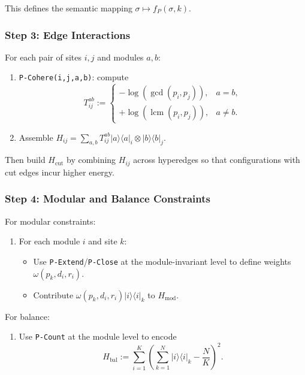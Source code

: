 \documentclass[11pt]{article}
\begin{document}
This defines the semantic mapping $\sigma \mapsto f_P(\sigma,k)$.

\subsubsection*{Step 3: Edge Interactions}

For each pair of sites $i,j$ and modules $a,b$:

\begin{enumerate}[label=(3.\arabic*)]
  \item \texttt{P-Cohere(i,j,a,b)}: compute
  \[
    T_{ij}^{ab} :=
    \begin{cases}
      -\log(\gcd(p_i,p_j)), & a = b,\\[3pt]
      +\log(\operatorname{lcm}(p_i,p_j)), & a \neq b.
    \end{cases}
  \]
  \item Assemble $H_{ij} = \sum_{a,b} T_{ij}^{ab} |a\rangle\langle a|_i \otimes |b\rangle\langle b|_j$.
\end{enumerate}

Then build $H_{\text{cut}}$ by combining $H_{ij}$ across hyperedges so that configurations with cut edges incur higher energy.

\subsubsection*{Step 4: Modular and Balance Constraints}

For modular constraints:

\begin{enumerate}[label=(4.\arabic*)]
  \item For each module $i$ and site $k$:
  \begin{itemize}
    \item Use \texttt{P-Extend}/\texttt{P-Close} at the module-invariant level to define weights $\omega(p_k,d_i,r_i)$.
    \item Contribute $\omega(p_k,d_i,r_i) |i\rangle\langle i|_k$ to $H_{\text{mod}}$.
  \end{itemize}
\end{enumerate}

For balance:

\begin{enumerate}[label=(4.\arabic*')]
  \item Use \texttt{P-Count} at the module level to encode
  \[
    H_{\text{bal}} := \sum_{i=1}^K \left(\sum_{k=1}^N |i\rangle\langle i|_k - \frac{N}{K}\right)^2.
  \]
\end{enumerate}
\end{document}
